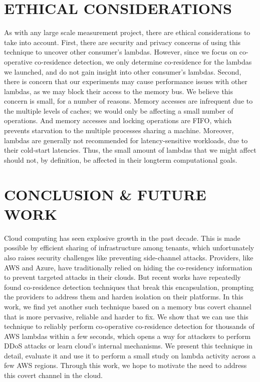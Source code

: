 
\section{ETHICAL CONSIDERATIONS}
As with any large scale measurement project, there are ethical considerations to
take into account. First, there are security and privacy concerns of using this
technique to uncover other consumer's lambdas. However, since we focus on
co-operative co-residence detection, we only determine co-residence for the
lambdas we launched, and do not gain insight into other consumer's lambdas.
Second, there is concern that our experiments may cause performance issues
with other lambdas, as we may block their access to the memory bus. We believe
this concern is small, for a number of reasons. Memory accesses are infrequent
due to the multiple levels of caches; we would only be affecting a small number
of operations. And memory accesses and locking operations are FIFO, which
prevents starvation to the multiple processes sharing a machine. Moreover,
lambdas are generally not recommended for latency-sensitive workloads, due to
their cold-start latencies. Thus, the small amount of lambdas that we might
affect should not, by definition, be affected in their longterm computational
goals. 


\section{CONCLUSION \& FUTURE WORK}
\label{sec:conclusion}
Cloud computing has seen explosive growth in the past decade. This is made
possible by efficient sharing of infrastructure among tenants, which
unfortunately also raises security challenges like preventing side-channel
attacks. Providers, like AWS and Azure, have traditionally relied on hiding the
co-residency information to prevent targeted attacks in their clouds. But recent
works have repeatedly found co-residence detection techniques that break this
encapsulation, prompting the providers to address them and harden isolation on
their platforms. In this work, we find yet another such technique based on a
memory bus covert channel that is more pervasive, reliable and harder to fix. We
show that we can use this technique to reliably perform co-operative
co-residence detection for thousands of AWS lambdas within a few seconds, which
opens a way for attackers to perform DDoS attacks or learn cloud's internal
mechanisms. We present this technique in detail, evaluate it and use it to
perform a small study on lambda activity across a few AWS regions.  Through this
work, we hope to motivate the need to address this covert channel in the cloud.

